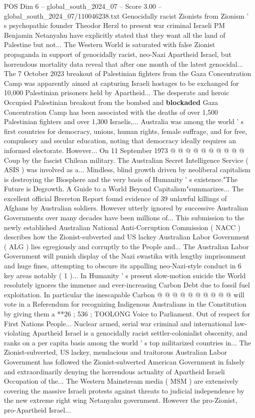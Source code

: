\begin{textsample}{POS Dim 6 – global\_south\_2024\_07 – Score 3.00 – global\_south\_2024\_07/110046238.txt}
Genocidally racist Zionists from Zionism ' s psychopathic founder Theodor Herzl to present war criminal Israeli PM Benjamin Netanyahu have explicitly stated that they want all the land of Palestine but not...
The Western World is saturated with false Zionist propaganda in support of genocidally racist, neo-Nazi Apartheid Israel, but horrendous mortality data reveal that after one month of the latest genocidal...
The 7 October 2023 breakout of Palestinian fighters from the Gaza Concentration Camp was apparently aimed at capturing Israeli hostages to be exchanged for 10,000 Palestinian prisoners held by Apartheid...
The desperate and heroic Occupied Palestinian breakout from the bombed and \textbf{blockaded} Gaza Concentration Camp has been associated with the deaths of over 1,500 Palestinian fighters and over 1,300 Israelis,...
Australia was among the world ' s first countries for democracy, unions, human rights, female suffrage, and for free, compulsory and secular education, noting that democracy ideally requires an informed electorate.
However...
On 11 September 1973 @ @ @ @ @ @ @ @ @ @ Coup by the fascist Chilean military.
The Australian Secret Intelligence Service ( ASIS ) was involved as a...
Mindless, blind growth driven by neoliberal capitalism is destroying the Biosphere and the very basis of Humanity ' s existence."The Future is Degrowth.
A Guide to a World Beyond Capitalism"summarizes...
The excellent official Brereton Report found evidence of 39 unlawful killings of Afghans by Australian soldiers.
However utterly ignored by successive Australian Governments over many decades have been millions of...
This submission to the newly established Australian National Anti-Corruption Commission ( NACC ) describes how the Zionist-subverted and US lackey Australian Labor Government ( ALG ) lies egregiously and corruptly to the People and...
The Australian Labor Government will punish display of the Nazi swastika with lengthy imprisonment and huge fines, attempting to obscure its appalling neo-Nazi-style conduct in 6 key areas notably ( 1 )...
In Humanity ' s present slow-motion suicide the World resolutely ignores the immense and ever-increasing Carbon Debt due to fossil fuel exploitation.
In particular the inescapable Carbon @ @ @ @ @ @ @ @ @ @ will vote in a Referendum for recognizing Indigenous Australians in the Constitution by giving them a **26 ; 536 ; TOOLONG Voice to Parliament.
Out of respect for First Nations People...
Nuclear armed, serial war criminal and international law-violating Apartheid Israel is a genocidally racist settler-colonialist obscenity, and ranks on a per capita basis among the world ' s top militarized countries in...
The Zionist-subverted, US lackey, mendacious and traitorous Australian Labor Government has followed the Zionist-subverted American Government in falsely and extraordinarily denying the horrendous actuality of Apartheid Israeli Occupation of the...
The Western Mainstream media ( MSM ) are extensively covering the massive Israeli protests against threats to judicial independence by the new extreme right wing Netanyahu government.
However the pro-Zionist, pro-Apartheid Israel...

\end{textsample}
